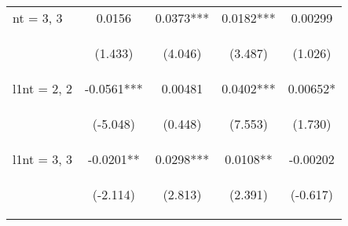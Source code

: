 \documentclass[]{article}
\begin{document}
\begin{center}
\begin{tabular}{lcccc}
        nt = 3, 3        & 0.0156                                          & 0.0373***                                      & 0.0182***                                      & 0.00299                                        \\
        \vspace{4pt}     & \begin{footnotesize}(1.433)\end{footnotesize}   & \begin{footnotesize}(4.046)\end{footnotesize}  & \begin{footnotesize}(3.487)\end{footnotesize}  & \begin{footnotesize}(1.026)\end{footnotesize}  \\
        l1nt = 2, 2      & -0.0561***                                      & 0.00481                                        & 0.0402***                                      & 0.00652*                                       \\
        \vspace{4pt}     & \begin{footnotesize}(-5.048)\end{footnotesize}  & \begin{footnotesize}(0.448)\end{footnotesize}  & \begin{footnotesize}(7.553)\end{footnotesize}  & \begin{footnotesize}(1.730)\end{footnotesize}  \\
        l1nt = 3, 3      & -0.0201**                                       & 0.0298***                                      & 0.0108**                                       & -0.00202                                       \\
        \vspace{4pt}     & \begin{footnotesize}(-2.114)\end{footnotesize}  & \begin{footnotesize}(2.813)\end{footnotesize}  & \begin{footnotesize}(2.391)\end{footnotesize}  & \begin{footnotesize}(-0.617)\end{footnotesize} \\

\end{tabular}
\end{center}
\end{document}
